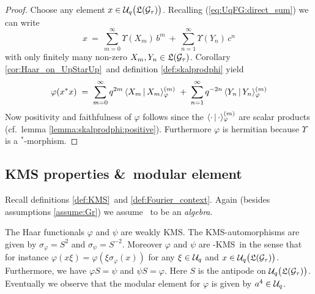 \begin{proof}
Choose any element $x\in \UqTG$. Recalling (\ref{eq:UqFG:direct_sum}) we can write
\begin{equation} \label{eq:expansion_element_of_UqTG}
 x \:=\: \sum_{m=0}^\infty \Upsilon(X_m)\, b^m \:+\:
         \sum_{n=1}^\infty \Upsilon(Y_n)\, c^n
\end{equation}
with only finitely many non-zero $X_m, Y_n \in \mathfrak{L}(\mathcal G_\tau)$.
Corollary \ref{cor:Haar_on_UpStarUp}\ and definition \ref{def:skalprodphi} yield
$$  \varphi(x^*x)\; = \;\sum_{m=0}^\infty q^{2m}\,  \langle X_m \,|\,X_m \rangle_\varphi^{(m)}
                  \;+\; \sum_{n=1}^\infty q^{-2n}\, \langle Y_n \,|\,Y_n \rangle_\varphi^{(m)}$$
Now positivity and faithfulness of $\varphi$ follows since the
$\langle \cdot \,|\,\cdot \rangle_\varphi^{(m)}$ are scalar products (cf.\ lemma \ref{lemma:skalprodphi:positive}).
Furthermore $\varphi$ is hermitian because $\Upsilon$ is a $^*$-morphism.
\end{proof}



\subsection{KMS properties \&\ modular element}

Recall definitions \ref{def:KMS}\ and \ref{def:Fourier_context}\@.
Again (besides assumptions \ref{assume:Gr}) we assume \Gtau\ to be an {\em algebra}\@.

\begin{prop} \label{prop:Uq:KMS}
The Haar functionals\/ $\varphi$ and\/ $\psi$ are weakly {\scriptsize KMS}\@.
The {\scriptsize KMS}-automorphisms are given by\/ $\sigma_\varphi = S^2$
and\/ $\sigma_\psi = S^{-2}$. Moreover\/ $\varphi$ and\/ $\psi$ are\/
\Uq-{\scriptsize KMS}\ in the sense that for instance\/
$\varphi(x \xi) = \varphi(\xi \sigma_{\!\varphi}(x))$
for any\/ $\xi \in {\mathcal U}_q$ and\/ $x\in \UqTG$.
Furthermore, we have\/ $\varphi S = \psi$ and\/ $\psi S = \varphi$.
Here\/ $S$ is the antipode on\/ $\UqTG$.
Eventually we observe that the modular element for\/ $\varphi$ is given by\/ $a^4\in{\mathcal U}_q$.
\end{prop}

